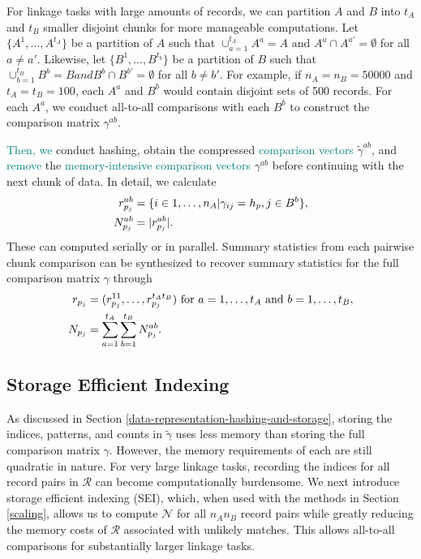 \documentclass[ba]{imsart}
\begin{document}
		For linkage tasks with large amounts of records, we can partition $A$ and $B$ into $t_A$ and $t_B$ smaller disjoint chunks for more manageable computations. Let $\{A^1, \dots, A^{t_A}\}$ be a partition of $A$ such that $\cup_{a=1}^{t_A} A^a = A$ and $A^a \cap A^{a'}=\emptyset$ for all $a \neq a'$.  Likewise, let $\{B^1, \dots, B^{t_b}\}$ be a partition of $B$ such that $\cup_{b=1}^{t_B} B^b = B and B^b \cap B^{b'}=\emptyset$ for all $b \neq b'$.  For example, if $n_A = n_B = 50000$ and $t_A = t_B = 100$, each $A^a$ and $B^b$ would contain disjoint sets of 500 records. For each $A^a$, we conduct all-to-all comparisons with each $B^b$ to construct the comparison matrix $\gamma^{ab}$. 
		
		\textcolor{teal}{Then, we} conduct hashing, obtain the compressed \textcolor{teal}{comparison vectors} $\tilde{\gamma}^{ab}$, and \textcolor{teal}{remove}
		the 
\textcolor{teal}{memory-intensive}
		\textcolor{teal}{comparison vectors} $\gamma^{ab}$ 
		before continuing with the next chunk of data. 
		In detail, we calculate
\begin{subequations}
	\begin{align}
		r_{p_j}^{ab} &= \{i \in 1, \dots, n_A| \gamma_{ij} = h_p, j \in B^b\}, \label{r_{p_j}^{ab}} \\
		N_{p_j}^{ab} &= |r_{p_j}^{ab}|. \label{N_{p_j}^{ab}}
	\end{align}
\end{subequations}
These can computed serially or in parallel. Summary statistics from each pairwise chunk comparison can be synthesized to recover summary statistics for the full comparison matrix $\gamma$ through
\begin{subequations}
	\begin{align}
		r_{p_j} &= (r_{p_j}^{11}, \ldots, r_{p_j}^{ t_A t_B}) \text{ for } a = 1, \ldots, t_A \text{ and } b = 1, \ldots, t_B, \label{r_{p_j}} \\
		N_{p_j} &= \sum_{a = 1}^{t_A} \sum_{b = 1}^{t_B} N_{p_j}^{ab}.\label{N_{p_j}}	\end{align}
\end{subequations} 

\hypertarget{SEI}{%
	\subsection{Storage Efficient Indexing}\label{SEI}}

As discussed in Section \ref{data-representation-hashing-and-storage}, storing the indices, patterns, and counts in $\tilde{\gamma}$ uses less memory than storing the full comparison matrix $\gamma$. However, the memory requirements of each are still quadratic in nature. For very large linkage tasks, recording the indices for all record pairs in $\mathcal{R}$ can become computationally burdensome. We next introduce storage efficient indexing (SEI), which, when used with the methods in Section \ref{scaling}, allows us to compute $\mathcal{N}$ for all $n_A n_B$ record pairs while greatly reducing the memory costs of $\mathcal{R}$ associated with unlikely matches. This allows all-to-all comparisons for substantially larger linkage tasks.
\end{document}
